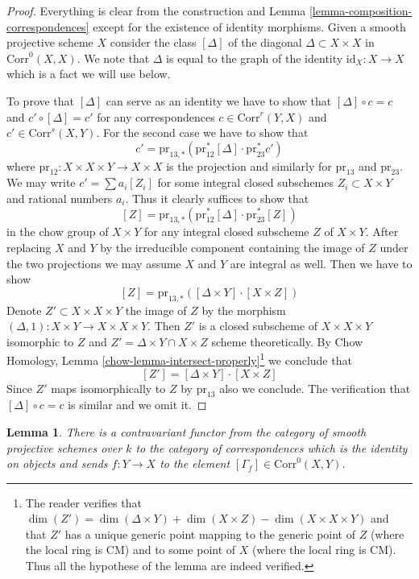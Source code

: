\documentclass{stacks-project}
\theoremstyle{plain}
\newtheorem{lemma}[subsection]{Lemma}
\theoremstyle{definition}
\theoremstyle{remark}
\numberwithin{equation}{subsection}
\begin{document}
\begin{proof}
Everything is clear from the construction and
Lemma \ref{lemma-composition-correspondences}
except for the existence of identity morphisms.
Given a smooth projective scheme $X$ consider
the class $[\Delta]$ of the diagonal $\Delta \subset X \times X$
in $\text{Corr}^0(X, X)$. We note that $\Delta$ is
equal to the graph of the identity $\text{id}_X : X \to X$
which is a fact we will use below.

\medskip\noindent
To prove that $[\Delta]$ can serve as an identity we have to show that
$[\Delta] \circ c = c$ and $c' \circ [\Delta] = c'$ for any correspondences
$c \in \text{Corr}^r(Y, X)$ and $c' \in \text{Corr}^s(X, Y)$.
For the second case we have to show that
$$
c' = \text{pr}_{13, *}(\text{pr}_{12}^*[\Delta] \cdot \text{pr}_{23}^*c')
$$
where $\text{pr}_{12} : X \times X \times Y \to X \times X$ is the
projection and similarly for $\text{pr}_{13}$ and $\text{pr}_{23}$.
We may write $c' = \sum a_i [Z_i]$ for some integral closed subschemes
$Z_i \subset X \times Y$ and rational numbers $a_i$. Thus it clearly
suffices to show that
$$
[Z] = \text{pr}_{13, *}(\text{pr}_{12}^*[\Delta] \cdot \text{pr}_{23}^*[Z])
$$
in the chow group of $X \times Y$ for any integral closed subscheme $Z$
of $X \times Y$. After replacing $X$ and $Y$ by the
irreducible component containing the image of $Z$ under the two projections
we may assume $X$ and $Y$ are integral as well. Then we have to show
$$
[Z] = \text{pr}_{13, *}([\Delta \times Y] \cdot [X \times Z])
$$
Denote $Z' \subset X \times X \times Y$ the image of $Z$ by the morphism
$(\Delta, 1) : X \times Y \to X \times X \times Y$. Then $Z'$
is a closed subscheme of $X \times X \times Y$ isomorphic to $Z$ and
$Z' = \Delta \times Y \cap X \times Z$ scheme theoretically.
By Chow Homology, Lemma \ref{chow-lemma-intersect-properly}\footnote{The
reader verifies that $\dim(Z') = \dim(\Delta \times Y) + \dim(X \times Z) -
\dim(X \times X \times Y)$ and that $Z'$ has a unique generic point
mapping to the generic point of $Z$ (where the local ring is CM)
and to some point of $X$ (where the local ring is CM). Thus all the
hypothese of the lemma are indeed verified.}
we conclude that
$$
[Z'] = [\Delta \times Y] \cdot [X \times Z]
$$
Since $Z'$ maps isomorphically to $Z$ by $\text{pr}_{13}$ also
we conclude. The verification that
$[\Delta] \circ c = c$ is similar and we omit it.
\end{proof}

\begin{lemma}
\label{lemma-contravariant-functor}
There is a contravariant functor from the category of smooth
projective schemes over $k$ to the category of correspondences
which is the identity on objects and sends $f : Y \to X$ to
the element $[\Gamma_f] \in \text{Corr}^0(X, Y)$.
\end{lemma}
\end{document}
